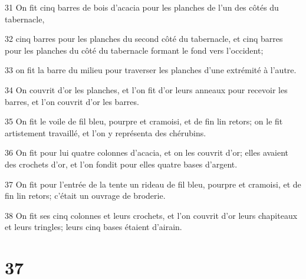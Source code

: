 \par 31 On fit cinq barres de bois d'acacia pour les planches de l'un des côtés du tabernacle,
\par 32 cinq barres pour les planches du second côté du tabernacle, et cinq barres pour les planches du côté du tabernacle formant le fond vers l'occident;
\par 33 on fit la barre du milieu pour traverser les planches d'une extrémité à l'autre.
\par 34 On couvrit d'or les planches, et l'on fit d'or leurs anneaux pour recevoir les barres, et l'on couvrit d'or les barres.
\par 35 On fit le voile de fil bleu, pourpre et cramoisi, et de fin lin retors; on le fit artistement travaillé, et l'on y représenta des chérubins.
\par 36 On fit pour lui quatre colonnes d'acacia, et on les couvrit d'or; elles avaient des crochets d'or, et l'on fondit pour elles quatre bases d'argent.
\par 37 On fit pour l'entrée de la tente un rideau de fil bleu, pourpre et cramoisi, et de fin lin retors; c'était un ouvrage de broderie.
\par 38 On fit ses cinq colonnes et leurs crochets, et l'on couvrit d'or leurs chapiteaux et leurs tringles; leurs cinq bases étaient d'airain.

\chapter{37}

